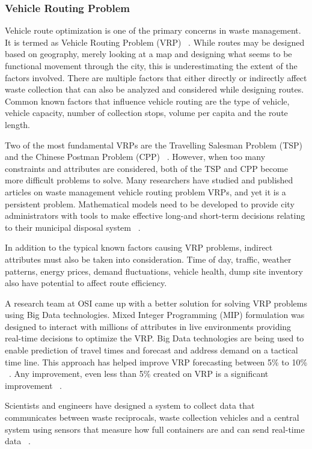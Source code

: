 \documentclass[sigconf]{acmart}
\begin{document}
\subsubsection{Vehicle Routing Problem}
Vehicle route optimization is one of the primary concerns in waste management. It is termed as Vehicle Routing Problem (VRP) ~\cite{dantzig1959}.   While routes may be designed based on geography, merely looking at a map and designing what seems to be functional movement through the city, this is underestimating the extent of the factors involved.  There are multiple factors that either directly or indirectly affect waste collection that can also be analyzed and considered while designing routes. Common known factors that influence vehicle routing are the type of vehicle, vehicle capacity, number of collection stops, volume per capita and the route length. 

Two of the most fundamental VRPs are the Travelling Salesman Problem (TSP) and the Chinese Postman Problem (CPP) ~\cite{belien2012}. However, when too many constraints and attributes are considered, both of the TSP and CPP become more difficult problems to solve. Many researchers have studied and published articles on waste management vehicle routing problem VRPs, and yet it is a persistent problem. Mathematical models need to be developed to provide city administrators with tools to make effective long-and short-term decisions relating to their municipal disposal system ~\cite{bhat1996}. 

In addition to the typical known factors causing VRP problems, indirect attributes must also be taken into consideration.  Time of day, traffic, weather patterns, energy prices, demand fluctuations, vehicle health, dump site inventory also have potential to affect route efficiency. 

A research team at OSI came up with a better solution for solving VRP problems using Big Data technologies. Mixed Integer Programming (MIP) formulation was designed to interact with millions of attributes in live environments providing real-time decisions to optimize the VRP. Big Data technologies are being used to enable prediction of travel times and forecast and address demand on a tactical time line. This approach has helped improve VRP forecasting between  5\% to 10\% ~\cite{vijay2013}. Any improvement, even less than 5\% created on VRP is a significant improvement ~\cite{hasle2007}.

Scientists and engineers have designed a system to collect data that communicates between waste reciprocals, waste collection vehicles and a central system using sensors that measure how full containers are and can send real-time data ~\cite{faccio2011}.
\end{document}
